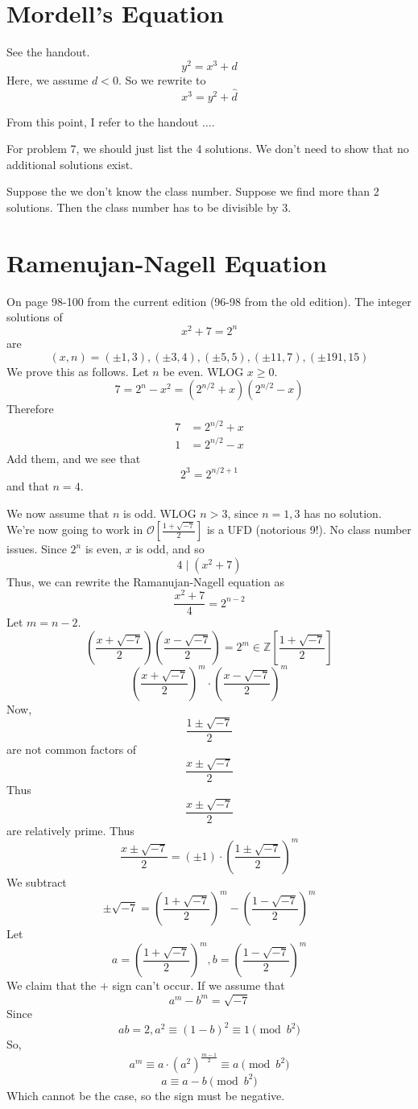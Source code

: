 \documentclass{article}
\begin{document}
\section{Mordell's Equation}
See the handout. 
\[ y^2 = x^3 + d \]
Here, we assume $d < 0$. So we rewrite to
\[ x^3 = y^2+ \hat{d} \]

From this point, I refer to the handout $\ldots$.

For problem 7, we should just list the 4 solutions. We don't need to show
that no additional solutions exist. 

Suppose the we don't know the class number. Suppose we find more than 2
solutions. Then the class number has to be divisible by 3. 

\section{Ramenujan-Nagell Equation}
On page 98-100 from the current edition (96-98 from the old edition). 
The integer solutions of 
\[ x^2 +7 = 2^n \]
are 
\[ (x,n) = (\pm 1, 3), (\pm 3, 4), (\pm 5, 5), (\pm 11, 7), (\pm 191, 15) \]
We prove this as follows. Let $n$ be even. WLOG $x\geq 0$. 
\[ 7 = 2^n - x^2  = (2^{n/2}+x)(2^{n/2}-x) \]
Therefore
\[\begin{array}{rl} 7 &= 2^{n/2} + x \\ 1 &= 2^{n/2}- x \end{array} \]
Add them, and we see that
\[ 2^{3} = 2^{n/2+1} \]
and that $n = 4$.

We now assume that $n$ is odd. WLOG $n > 3$, since $n = 1,3$ has no solution. 
We're now going to work in $\mathcal{O}[\frac{1+\sqrt{-7}}{2}]$ is a UFD
(notorious 9!). No class number issues. Since $2^n$ is even, $x$ is odd, and so
\[ 4 \mid (x^2 + 7) \]
Thus, we can rewrite the Ramanujan-Nagell equation as
\[ \frac{x^2+7}{4} = 2^{n-2} \]
Let $m = n-2$. 
\[ \left( \frac{x+\sqrt{-7}}{2}\right)\left(\frac{x - \sqrt{-7}}{2}\right) = 2^m
\in \mathbb{Z}[\frac{1+\sqrt{-7}}{2}] \]
\[ \left( \frac{x+\sqrt{-7}}{2}\right)^m\cdot \left(\frac{x -
\sqrt{-7}}{2}\right)^m  \]
Now,
\[ \frac{1\pm \sqrt{-7}}{2} \]
are not common factors of
\[ \frac{x\pm \sqrt{-7}}{2} \]
Thus
\[ \frac{x\pm \sqrt{-7}}{2} \]
are relatively prime. Thus
\[ \frac{x\pm \sqrt{-7}}{2} = (\pm 1)\cdot
\left(\frac{1\pm\sqrt{-7}}{2}\right)^m \]
We subtract
\[ \pm \sqrt{-7} =
\left(\frac{1+\sqrt{-7}}{2}\right)^m-\left(\frac{1-\sqrt{-7}}{2}\right)^m \]
Let 
\[ a = \left(\frac{1+\sqrt{-7}}{2}\right)^m, b = \left(\frac{1-\sqrt{-7}}{2}\right)^m \]
We claim that the $+$ sign can't occur. If we assume that
\[ a^m - b^m = \sqrt{-7} \]
Since
\[ ab = 2, a^2 \equiv (1-b)^2 \equiv 1 \pmod{b^2} \]
So,
\[ a^m \equiv a \cdot (a^2)^{\frac{m-1}{2}} \equiv a \pmod{b^2} \]
\[ a \equiv a - b \pmod{b^2} \]
Which cannot be the case, so the sign must be negative. 
\end{document}
